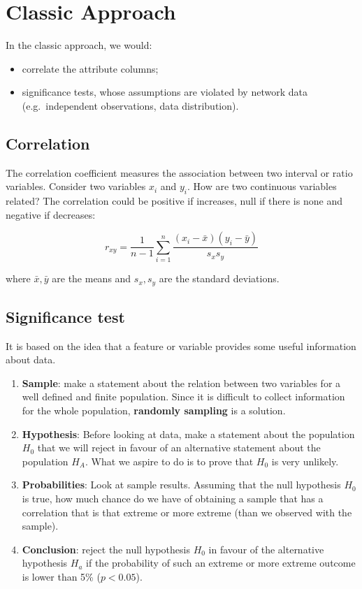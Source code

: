 \documentclass[
  notitlepage,
  onecolumn,
  openany]{book}
\providecommand{\tightlist}{%
  \setlength{\itemsep}{0pt}\setlength{\parskip}{0pt}}
\begin{document}
\hypertarget{classic-approach}{%
\section{Classic Approach}\label{classic-approach}}

In the classic approach, we would:

\begin{itemize}
\tightlist
\item
  correlate the attribute columns;
\item
  significance tests, whose assumptions are violated by network data (e.g.~independent observations, data distribution).
\end{itemize}

\hypertarget{correlation}{%
\subsection{Correlation}\label{correlation}}

The correlation coefficient measures the association between two interval or ratio variables. Consider two variables \(x_i\) and \(y_i\). How are two continuous variables related? The correlation could be positive if increases, null if there is none and negative if decreases:

\[
r_{xy} = \frac{1}{n-1}\sum^n_{i=1} \frac{(x_i-\bar{x})(y_i-\bar{y})}{s_xs_y}
\]

where \(\bar{x}, \bar{y}\) are the means and \(s_x,s_y\) are the standard deviations.

\hypertarget{significance-test}{%
\subsection{Significance test}\label{significance-test}}

It is based on the idea that a feature or variable provides some useful information about data.

\begin{enumerate}
\def\labelenumi{\arabic{enumi}.}
\tightlist
\item
  \textbf{Sample}: make a statement about the relation between two variables for a well defined and finite population. Since it is difficult to collect information for the whole population, \textbf{randomly sampling} is a solution.
\item
  \textbf{Hypothesis}: Before looking at data, make a statement about the population \(H_0\) that we will reject in favour of an alternative statement about the population \(H_A\). What we aspire to do is to prove that \(H_0\) is very unlikely.
\item
  \textbf{Probabilities}: Look at sample results. Assuming that the null hypothesis \(H_0\) is true, how much chance do we have of obtaining a sample that has a correlation that is that extreme or more extreme (than we observed with the sample).
\item
  \textbf{Conclusion}: reject the null hypothesis \(H_0\) in favour of the alternative hypothesis \(H_a\) if the probability of such an extreme or more extreme outcome is lower than 5\% (\(p<0.05\)).
\end{enumerate}
\end{document}
